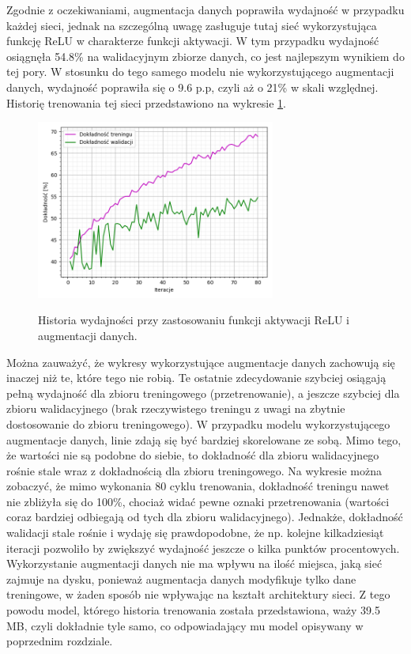Zgodnie z oczekiwaniami, augmentacja danych poprawiła wydajność w przypadku każdej sieci, jednak na szczególną uwagę zasługuje tutaj sieć wykorzystująca funkcję ReLU w charakterze funkcji aktywacji. W tym przypadku wydajność osiągnęła 54.8\% na walidacyjnym zbiorze danych, co jest najlepszym wynikiem do tej pory. W stosunku do tego samego modelu nie wykorzystującego augmentacji danych, wydajność poprawiła się o 9.6 p.p, czyli aż o 21\% w skali względnej. Historię trenowania tej sieci przedstawiono na wykresie \ref{pic:5.4}. 
\begin{figure}[H]
    \caption{Historia wydajności przy zastosowaniu funkcji aktywacji ReLU i augmentacji danych.}
    \centering
    \includegraphics[width=0.7\textwidth]{wykres4.png}
    \label{pic:5.4}
\end{figure}
Można zauważyć, że wykresy wykorzystujące augmentacje danych zachowują się inaczej niż te, które tego nie robią. Te ostatnie zdecydowanie szybciej osiągają pełną wydajność dla zbioru treningowego (przetrenowanie), a jeszcze szybciej dla zbioru walidacyjnego (brak rzeczywistego treningu z uwagi na zbytnie dostosowanie do zbioru treningowego). W przypadku modelu wykorzystującego augmentacje danych, linie zdają się być bardziej skorelowane ze sobą. Mimo tego, że wartości nie są podobne do siebie, to dokładność dla zbioru walidacyjnego rośnie stale wraz z dokładnością dla zbioru treningowego. Na wykresie można zobaczyć, że mimo wykonania 80 cyklu trenowania, dokładność treningu nawet nie zbliżyła się do 100\%, chociaż widać pewne oznaki przetrenowania (wartości coraz bardziej odbiegają od tych dla zbioru walidacyjnego). Jednakże, dokładność walidacji stale rośnie i wydaję się prawdopodobne, że np. kolejne kilkadziesiąt iteracji pozwoliło by zwiększyć wydajność jeszcze o kilka punktów procentowych. Wykorzystanie augmentacji danych nie ma wpływu na ilość miejsca, jaką sieć zajmuje na dysku, ponieważ augmentacja danych modyfikuje tylko dane treningowe, w żaden sposób nie wpływając na kształt architektury sieci. Z tego powodu model, którego historia trenowania została przedstawiona, waży 39.5 MB, czyli dokładnie tyle samo, co odpowiadający mu model opisywany w poprzednim rozdziale.

